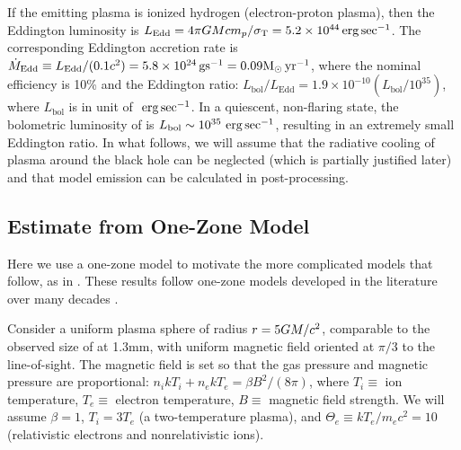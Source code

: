 If the emitting plasma is ionized hydrogen (electron-proton plasma), then the Eddington luminosity is
$L_\mathrm{Edd} = 4\pi GM c m_p/\sigma_\mathrm{T} = 5.2 \times 10^{44}\,\mathrm{erg} \,\mathrm{sec}^{-1}$.
The corresponding Eddington accretion rate is
$\dot{M}_\mathrm{Edd} \equiv L_\mathrm{Edd}/(0.1 c^2) = 5.8 \times 10^{24} \,\mathrm{g} \rm{s}^{-1} = 0.09 M_\odot \,\mathrm{yr}^{-1}$,
where the nominal efficiency is 10\% and the Eddington ratio:
$L_\mathrm{bol}/L_\mathrm{Edd} = 1.9 \times 10^{-10} (L_\mathrm{bol} /10^{35})$,
where $L_\mathrm{bol}$ is in unit of $\,\,\mathrm{erg}\,\mathrm{sec}^{-1}$.
In a quiescent, non-flaring state, the bolometric luminosity of \sgra is $L_\mathrm{bol} \sim 10^{35}\,\,\mathrm{erg}\,\mathrm{sec}^{-1}$, resulting in an extremely small Eddington ratio.
In what follows, we will assume that the radiative cooling of plasma around the black hole can be neglected (which is partially justified later) and that model emission can be calculated in post-processing.

\subsection{Estimate from One-Zone Model}

Here we use a one-zone model to motivate the more complicated models that follow, as in .
These results follow one-zone models developed in the literature over many decades \citep[e.g.][]{1996IAUS..169..169F}.

Consider a uniform plasma sphere of radius $r = 5GM/c^2$, comparable to the observed size of \sgra at 1.3mm, with uniform magnetic field oriented at $\pi/3$ to the line-of-sight.
The magnetic field is set so that the gas pressure and magnetic pressure are proportional: $n_i k T_i + n_e k T_e = \beta B^2/(8\pi)$, where $T_i \equiv$ ion temperature, $T_e \equiv$ electron temperature, $B \equiv$ magnetic field strength.  We will assume $\beta=1$, $T_i = 3 T_e$ (a two-temperature plasma), and $\Theta_e \equiv  k T_e / m_e c^2 = 10$ (relativistic electrons and nonrelativistic ions).

